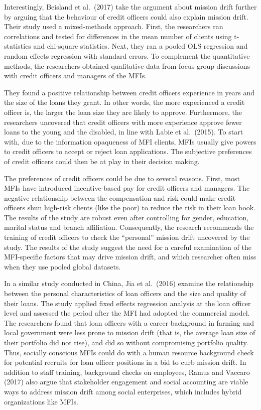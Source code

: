 \documentclass[a4paper, nobind]{templates/ociamthesis}
\begin{document}
\noindent Interestingly, Beisland et al.~(2017) take the argument about mission drift further by arguing that the behaviour of credit officers could also explain mission drift. Their study used a mixed-methods approach. First, the researchers ran correlations and tested for differences in the mean number of clients using t-statistics and chi-square statistics. Next, they ran a pooled OLS regression and random effects regression with standard errors. To complement the quantitative methods, the researchers obtained qualitative data from focus group discussions with credit officers and managers of the MFIs.

They found a positive relationship between credit officers experience in years and the size of the loans they grant. In other words, the more experienced a credit officer is, the larger the loan size they are likely to approve. Furthermore, the researchers uncovered that credit officers with more experience approve fewer loans to the young and the disabled, in line with Labie et al.~(2015). To start with, due to the information opaqueness of MFI clients, MFIs usually give powers to credit officers to accept or reject loan applications. The subjective preferences of credit officers could then be at play in their decision making.

The preferences of credit officers could be due to several reasons. First, most MFIs have introduced incentive-based pay for credit officers and managers. The negative relationship between the compensation and risk could make credit officers shun high-risk clients (like the poor) to reduce the risk in their loan book. The results of the study are robust even after controlling for gender, education, marital status and branch affiliation. Consequently, the research recommends the training of credit officers to check the ``personal'' mission drift uncovered by the study. The results of the study suggest the need for a careful examination of the MFI-specific factors that may drive mission drift, and which researcher often miss when they use pooled global datasets.

In a similar study conducted in China, Jia et al.~(2016) examine the relationship between the personal characteristics of loan officers and the size and quality of their loans. The study applied fixed effects regression analysis at the loan officer level and assessed the period after the MFI had adopted the commercial model. The researchers found that loan officers with a career background in farming and local government were less prone to mission drift (that is, the average loan size of their portfolio did not rise), and did so without compromising portfolio quality. Thus, socially conscious MFIs could do with a human resource background check for potential recruits for loan officer positions in a bid to curb mission drift. In addition to staff training, background checks on employees, Ramus and Vaccaro (2017) also argue that stakeholder engagement and social accounting are viable ways to address mission drift among social enterprises, which includes hybrid organizations like MFIs.
\end{document}
